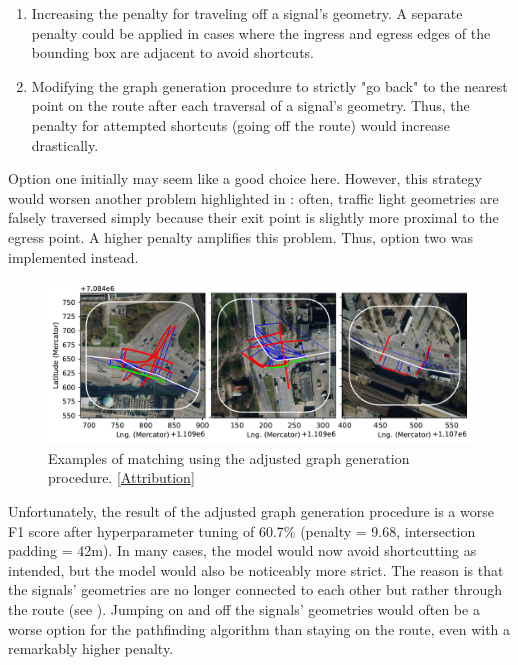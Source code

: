 \begin{enumerate}
    \item Increasing the penalty for traveling off a signal's geometry. A separate penalty could be applied in cases where the ingress and egress edges of the bounding box are adjacent to avoid shortcuts.
    \item  Modifying the graph generation procedure to strictly "go back" to the nearest point on the route after each traversal of a signal's geometry. Thus, the penalty for attempted shortcuts (going off the route) would increase drastically.
\end{enumerate}

Option one initially may seem like a good choice here. However, this strategy would worsen another problem highlighted in : often, traffic light geometries are falsely traversed simply because their exit point is slightly more proximal to the egress point. A higher penalty amplifies this problem. Thus, option two was implemented instead. 

\begin{figure}[htbp]
\centering
\includegraphics[width=\linewidth]{images/matching-dijkstra-strict.pdf}
\caption{Examples of matching using the adjusted graph generation procedure. [\hyperref[attribution]{Attribution}]}
\label{fig:sg-selection-graph-strict}
\end{figure}

Unfortunately, the result of the adjusted graph generation procedure is a worse F1 score after hyperparameter tuning of 60.7\% (penalty = 9.68, intersection padding = 42m). In many cases, the model would now avoid shortcutting as intended, but the model would also be noticeably more strict. The reason is that the signals' geometries are no longer connected to each other but rather through the route (see ). Jumping on and off the signals' geometries would often be a worse option for the pathfinding algorithm than staying on the route, even with a remarkably higher penalty. 

